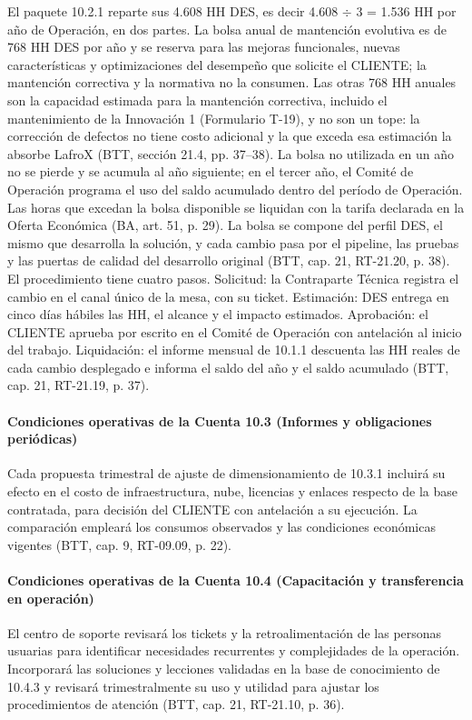 El paquete 10.2.1 reparte sus 4.608 HH DES, es decir 4.608 \ensuremath{\div} 3 = 1.536 HH por año de Operación, en dos partes. La bolsa anual de mantención evolutiva es de 768 HH DES por año y se reserva para las mejoras funcionales, nuevas características y optimizaciones del desempeño que solicite el CLIENTE; la mantención correctiva y la normativa no la consumen. Las otras 768 HH anuales son la capacidad estimada para la mantención correctiva, incluido el mantenimiento de la Innovación 1 (Formulario T-19), y no son un tope: la corrección de defectos no tiene costo adicional y la que exceda esa estimación la absorbe LafroX (BTT, sección 21.4, pp. 37--38). La bolsa no utilizada en un año no se pierde y se acumula al año siguiente; en el tercer año, el Comité de Operación programa el uso del saldo acumulado dentro del período de Operación. Las horas que excedan la bolsa disponible se liquidan con la tarifa declarada en la Oferta Económica (BA, art. 51, p. 29). La bolsa se compone del perfil DES, el mismo que desarrolla la solución, y cada cambio pasa por el pipeline, las pruebas y las puertas de calidad del desarrollo original (BTT, cap. 21, RT-21.20, p. 38). El procedimiento tiene cuatro pasos. Solicitud: la Contraparte Técnica registra el cambio en el canal único de la mesa, con su ticket. Estimación: DES entrega en cinco días hábiles las HH, el alcance y el impacto estimados. Aprobación: el CLIENTE aprueba por escrito en el Comité de Operación con antelación al inicio del trabajo. Liquidación: el informe mensual de 10.1.1 descuenta las HH reales de cada cambio desplegado e informa el saldo del año y el saldo acumulado (BTT, cap. 21, RT-21.19, p. 37).

\paragraph{Condiciones operativas de la Cuenta 10.3 (Informes y obligaciones periódicas)}
Cada propuesta trimestral de ajuste de dimensionamiento de 10.3.1 incluirá su efecto en el costo de infraestructura, nube, licencias y enlaces respecto de la base contratada, para decisión del CLIENTE con antelación a su ejecución. La comparación empleará los consumos observados y las condiciones económicas vigentes (BTT, cap. 9, RT-09.09, p. 22).

\paragraph{Condiciones operativas de la Cuenta 10.4 (Capacitación y transferencia en operación)}
El centro de soporte revisará los tickets y la retroalimentación de las personas usuarias para identificar necesidades recurrentes y complejidades de la operación. Incorporará las soluciones y lecciones validadas en la base de conocimiento de 10.4.3 y revisará trimestralmente su uso y utilidad para ajustar los procedimientos de atención (BTT, cap. 21, RT-21.10, p. 36).

